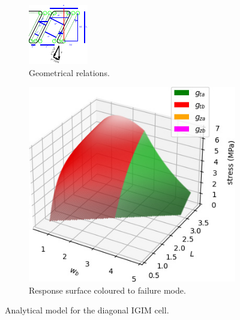 \begin{figure}
	\centering
	\begin{subfigure}[B]{.4\columnwidth}
		\includegraphics{sources/method/diagonal_math.pdf}
		\caption{Geometrical relations.}
		\label{fig:analytical_math_diagonal}
	\end{subfigure}
	\begin{subfigure}[B]{.59\columnwidth}
		\includegraphics{sources/method/analytic_response_diagonal.jpg}
		\caption{Response surface coloured to failure mode.}
		\label{fig:analytic_response_diagonal}
	\end{subfigure}
	\caption{Analytical model for the diagonal IGIM cell.}
\end{figure}

